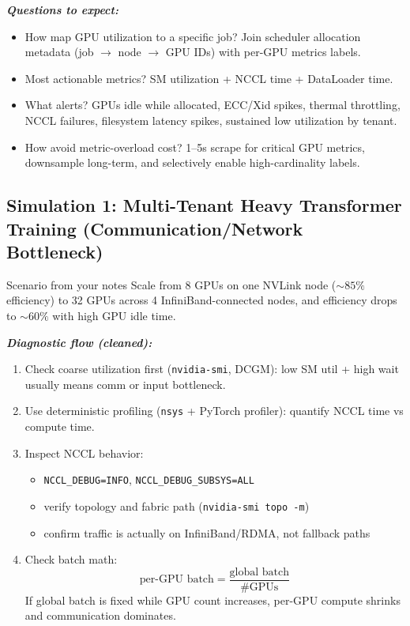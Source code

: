 \documentclass[12pt]{article}
\let\origtextbf\textbf
\renewcommand{\textbf}[1]{\origtextbf{\textit{#1}}}
\begin{document}
\textbf{Questions to expect:}
\begin{itemize}
\item How map GPU utilization to a specific job? Join scheduler allocation metadata (job \(\rightarrow\) node \(\rightarrow\) GPU IDs) with per-GPU metrics labels.
\item Most actionable metrics? SM utilization + NCCL time + DataLoader time.
\item What alerts? GPUs idle while allocated, ECC/Xid spikes, thermal throttling, NCCL failures, filesystem latency spikes, sustained low utilization by tenant.
\item How avoid metric-overload cost? 1--5s scrape for critical GPU metrics, downsample long-term, and selectively enable high-cardinality labels.
\end{itemize}

\subsection{Simulation 1: Multi-Tenant Heavy Transformer Training (Communication/Network Bottleneck)}

\begin{greenbox}{Scenario from your notes}
Scale from 8 GPUs on one NVLink node (\(\sim85\%\) efficiency) to 32 GPUs across 4 InfiniBand-connected nodes, and efficiency drops to \(\sim60\%\) with high GPU idle time.
\end{greenbox}

\textbf{Diagnostic flow (cleaned):}
\begin{enumerate}[leftmargin=1.3em]
\item Check coarse utilization first (\texttt{nvidia-smi}, DCGM): low SM util + high wait usually means comm or input bottleneck.
\item Use deterministic profiling (\texttt{nsys} + PyTorch profiler): quantify NCCL time vs compute time.
\item Inspect NCCL behavior:
\begin{itemize}
\item \texttt{NCCL\_DEBUG=INFO}, \texttt{NCCL\_DEBUG\_SUBSYS=ALL}
\item verify topology and fabric path (\texttt{nvidia-smi topo -m})
\item confirm traffic is actually on InfiniBand/RDMA, not fallback paths
\end{itemize}
\item Check batch math:
\[
\text{per-GPU batch}=\frac{\text{global batch}}{\#\text{GPUs}}
\]
If global batch is fixed while GPU count increases, per-GPU compute shrinks and communication dominates.
\end{enumerate}
\end{document}
